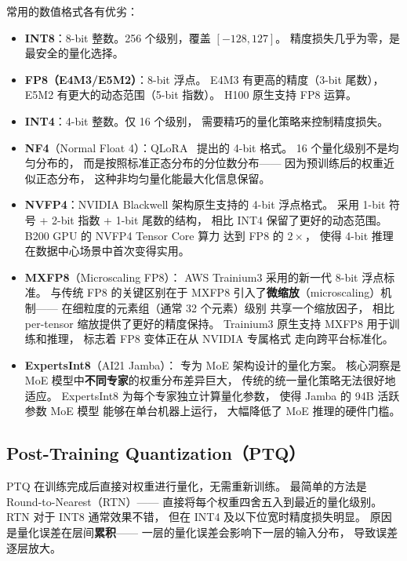 常用的数值格式各有优劣：
\begin{itemize}[noitemsep]
  \item \textbf{INT8}：8-bit 整数。256 个级别，覆盖 $[-128, 127]$。
        精度损失几乎为零，是最安全的量化选择。
  \item \textbf{FP8（E4M3/E5M2）}：8-bit 浮点。
        E4M3 有更高的精度（3-bit 尾数），E5M2 有更大的动态范围（5-bit 指数）。
        H100 原生支持 FP8 运算。
  \item \textbf{INT4}：4-bit 整数。仅 16 个级别，
        需要精巧的量化策略来控制精度损失。
  \item \textbf{NF4}（Normal Float 4）：QLoRA~\cite{dettmers2023qlora} 提出的 4-bit 格式。
        16 个量化级别不是均匀分布的，
        而是按照标准正态分布的分位数分布——
        因为预训练后的权重近似正态分布，
        这种非均匀量化能最大化信息保留。
  \item \textbf{NVFP4}：NVIDIA Blackwell 架构原生支持的 4-bit 浮点格式。
        采用 1-bit 符号 + 2-bit 指数 + 1-bit 尾数的结构，
        相比 INT4 保留了更好的动态范围。
        B200 GPU 的 NVFP4 Tensor Core 算力
        达到 FP8 的 $2\times$，
        使得 4-bit 推理在数据中心场景中首次变得实用。
  \item \textbf{MXFP8}（Microscaling FP8）：
        AWS Trainium3 采用的新一代 8-bit 浮点标准。
        与传统 FP8 的关键区别在于
        MXFP8 引入了\textbf{微缩放}（microscaling）机制——
        在细粒度的元素组（通常 32 个元素）级别
        共享一个缩放因子，
        相比 per-tensor 缩放提供了更好的精度保持。
        Trainium3 原生支持 MXFP8 用于训练和推理，
        标志着 FP8 变体正在从 NVIDIA 专属格式
        走向跨平台标准化。
  \item \textbf{ExpertsInt8}（AI21 Jamba）：
        专为 MoE 架构设计的量化方案。
        核心洞察是 MoE 模型中\textbf{不同专家}的权重分布差异巨大，
        传统的统一量化策略无法很好地适应。
        ExpertsInt8 为每个专家独立计算量化参数，
        使得 Jamba 的 94B 活跃参数 MoE 模型
        能够在单台机器上运行，
        大幅降低了 MoE 推理的硬件门槛。
\end{itemize}

\subsection{Post-Training Quantization（PTQ）}

PTQ 在训练完成后直接对权重进行量化，无需重新训练。
最简单的方法是 Round-to-Nearest（RTN）——
直接将每个权重四舍五入到最近的量化级别。
RTN 对于 INT8 通常效果不错，
但在 INT4 及以下位宽时精度损失明显。
原因是量化误差在层间\textbf{累积}——
一层的量化误差会影响下一层的输入分布，
导致误差逐层放大。

